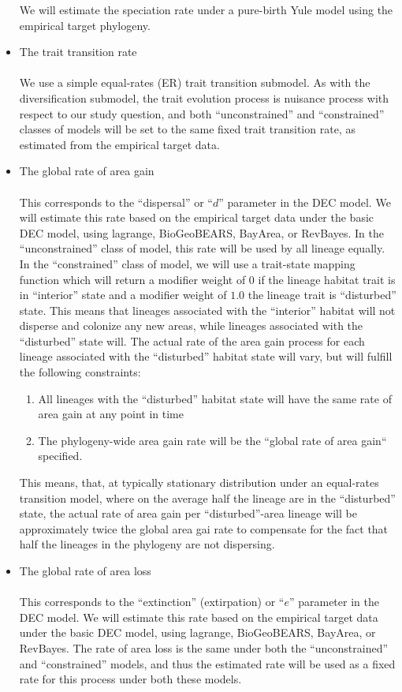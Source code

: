 \documentclass[11pt,openany]{memoir} %
\begin{document}
\begin{itemize}
        We will estimate the speciation rate under a pure-birth Yule model using the empirical target phylogeny.
    \item The trait transition rate \hfill \\
        \\
        We use a simple equal-rates (ER) trait transition submodel.
        As with the diversification submodel, the trait evolution process is nuisance process with respect to our study question, and both ``unconstrained'' and ``constrained'' classes of models will be set to the same fixed trait transition rate, as estimated from the empirical target data.
    \item The global rate of area gain \hfill \\
        \\
        This corresponds to the ``dispersal'' or ``$d$'' parameter in the DEC model.
        We will estimate this rate based on the empirical target data under the basic DEC model, using lagrange, BioGeoBEARS, BayArea, or RevBayes.
        In the ``unconstrained'' class of model, this rate will be used by all lineage equally.
        In the ``constrained'' class of model, we will use a trait-state mapping function which will return a modifier weight of $0$ if the lineage habitat trait is in ``interior'' state and a modifier weight of $1.0$ the lineage trait is ``disturbed'' state.
        This means that lineages associated with the ``interior'' habitat will not disperse and colonize any new areas, while lineages associated with the ``disturbed'' state will.
        The actual rate of the area gain process for each lineage associated with the ``disturbed'' habitat state will vary, but will fulfill the following constraints:
        \begin{enumerate}
            \item All lineages with the ``disturbed'' habitat state will have the same rate of area gain at any point in time
            \item The phylogeny-wide area gain rate will be the ``global rate of area gain`` specified.
        \end{enumerate}
        This means, that, at typically stationary distribution under an equal-rates transition model, where on the average half the lineage are in the ``disturbed'' state, the actual rate of area gain per ``disturbed''-area lineage will be approximately twice the global area gai rate to compensate for the fact that half the lineages in the phylogeny are not dispersing.
    \item The global rate of area loss \hfill \\
        \\
        This corresponds to the ``extinction'' (extirpation) or ``$e$'' parameter in the DEC model.
        We will estimate this rate based on the empirical target data under the basic DEC model, using lagrange, BioGeoBEARS, BayArea, or RevBayes.
        The rate of area loss is the same under both the ``unconstrained'' and ``constrained'' models, and thus the estimated rate will be used as a fixed rate for this process under both these models.

\end{itemize}
\end{document}
